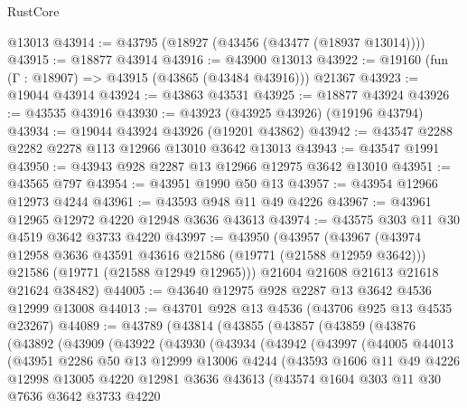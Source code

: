 \begin{lexlean}{RustCore}
\begin{coremodule}
    @13013
@43914 := @43795 (@18927 (@43456 (@43477 (@18937 @13014))))
@43915 := @18877 @43914
@43916 := @43900 @13013
@43922 := @19160 (fun (Γ : @18907) => @43915 (@43865 (@43484 @43916))) @21367
@43923 := @19044 @43914
@43924 := @43863 @43531
@43925 := @18877 @43924
@43926 := @43535 @43916
@43930 := @43923 (@43925 @43926) (@19196 @43794)
@43934 := @19044 @43924 @43926 (@19201 @43862)
@43942 := @43547 @2288 @2282 @2278 @113 @12966 @13010 @3642 @13013
@43943 := @43547 @1991
@43950 := @43943 @928 @2287 @13 @12966 @12975 @3642 @13010
@43951 := @43565 @797
@43954 := @43951 @1990 @50 @13
@43957 := @43954 @12966 @12973 @4244
@43961 := @43593 @948 @11 @49 @4226
@43967 := @43961 @12965 @12972 @4220 @12948 @3636 @43613
@43974 := @43575 @303 @11 @30 @4519 @3642 @3733 @4220
@43997 := @43950
    (@43957
      (@43967
        (@43974 @12958 @3636 @43591 @43616 @21586 (@19771 (@21588 @12959 @3642)))
        @21586
        (@19771 (@21588 @12949 @12965)))
      @21604
      @21608
      @21613
      @21618
      @21624
      @38482)
@44005 := @43640 @12975 @928 @2287 @13 @3642 @4536 @12999 @13008
@44013 := @43701 @928 @13 @4536 (@43706 @925 @13 @4535 @23267)
@44089 := @43789
    (@43814
      (@43855
        (@43857
          (@43859
            (@43876
              (@43892
                (@43909
                  (@43922
                    (@43930
                      (@43934
                        (@43942
                          (@43997
                            (@44005
                              @44013
                              (@43951
                                @2286
                                @50
                                @13
                                @12999
                                @13006
                                @4244
                                (@43593
                                  @1606
                                  @11
                                  @49
                                  @4226
                                  @12998
                                  @13005
                                  @4220
                                  @12981
                                  @3636
                                  @43613
                                  (@43574
                                    @1604
                                    @303
                                    @11
                                    @30
                                    @7636
                                    @3642
                                    @3733
                                    @4220

\end{coremodule}
\end{lexlean}
